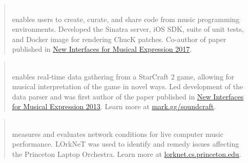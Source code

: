 

\begin{cvparagraph}


\begin{quote}
\\\leading{13pt} 
\thinspace enables users to create, curate, and share code from music programming environments. 
Developed the Sinatra server, iOS SDK, suite of unit tests, and Docker image for rendering ChucK patches. 
Co-author of paper published in \href{http://homes.create.aau.dk/dano/nime17/papers/0044/paper0044.pdf}{\underline{New Interfaces for Musical Expression 2017}}. 
\end{quote}

\begin{quote}
\\\leading{13pt}
\thinspace enables real-time data gathering from a StarCraft 2 game, allowing for musical interpretation of the game in novel ways. 
Led development of the data parser and was first author of the paper published in \href{http://www.nime.org/proceedings/2013/nime2013_146.pdf}{\underline{New Interfaces for Musical Expression 2013}}. 
Learn more at \href{mark.gg/soundcraft}{\underline{mark.gg/soundcraft}}.
\end{quote}

\begin{quote}
\\\leading{13pt}
\thinspace measures and evaluates network conditions for live computer music performance. 
LOrkNeT was used to identify and remedy issues affecting the Princeton Laptop Orchestra. 
Learn more at \href{lorknet.cs.princeton.edu}{\underline{lorknet.cs.princeton.edu}}.
\end{quote}

\end{cvparagraph}
